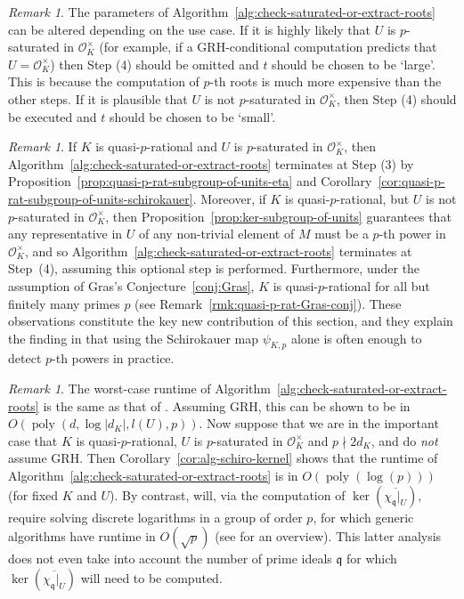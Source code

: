 \documentclass[12pt, a4paper, usenames]{amsart}
\theoremstyle{plain}
\theoremstyle{remark}
\newtheorem{remark}[theorem]{Remark}
\theoremstyle{definition}
\DeclareMathOperator{\poly}{poly}
\begin{document}
\begin{remark}\label{rmk:parameters}
The parameters of Algorithm~\ref{alg:check-saturated-or-extract-roots} can 
be altered depending on the use case. 
If it is highly likely that $U$ is $p$-saturated in $\mathcal{O}_{K}^{\times}$
(for example, if a GRH-conditional computation predicts that $U=\mathcal{O}_{K}^{\times}$)
then Step (4) should be omitted and $t$ should be chosen to be `large'.
This is because the computation of $p$-th roots is much more expensive
than the other steps. 
If it is plausible that $U$ is not $p$-saturated in $\mathcal{O}_{K}^{\times}$,
then Step (4) should be executed and $t$ should be chosen to be `small'.
\end{remark}

\begin{remark}\label{rem:satalg-complexity}
If $K$ is quasi-$p$-rational and 
$U$ is $p$-saturated in $\mathcal{O}_{K}^{\times}$, 
then Algorithm~\ref{alg:check-saturated-or-extract-roots} terminates at Step (3)
by Proposition~\ref{prop:quasi-p-rat-subgroup-of-units-eta} and Corollary~\ref{cor:quasi-p-rat-subgroup-of-units-schirokauer}.
Moreover, if $K$ is quasi-$p$-rational, but 
$U$ is not $p$-saturated in $\mathcal{O}_{K}^{\times}$, then Proposition~\ref{prop:ker-subgroup-of-units} guarantees that any representative in $U$ of any non-trivial element of $M$
must be a $p$-th power in $\mathcal{O}_{K}^{\times}$, and so 
Algorithm~\ref{alg:check-saturated-or-extract-roots} terminates at Step~(4), assuming
this optional step is performed.
Furthermore, under the assumption of Gras's Conjecture~\ref{conj:Gras}, $K$ is quasi-$p$-rational for all but finitely many primes $p$
(see Remark~\ref{rmk:quasi-p-rat-Gras-conj}). 
These observations constitute the key new contribution of this section, 
and they explain the finding in 
\cite[\S 6.2.3]{zbMATH07854947} that using the Schirokauer map $\psi_{K,p}$
alone is often enough to detect $p$-th powers in practice.
\end{remark}

\begin{remark}\label{rem:satalg-complexity-worst-case}
The worst-case runtime of Algorithm~\ref{alg:check-saturated-or-extract-roots} is the 
same as that of \cite[Algorithm~4.9]{MR4440537}.
Assuming GRH, this can be shown to be in $O(\poly(d, \log\lvert d_K\rvert, l(U), p))$.
Now suppose that we are in the important case that 
$K$ is quasi-$p$-rational, $U$ is $p$-saturated in $\mathcal{O}_{K}^{\times}$
and $p \nmid 2d_{K}$, and do \emph{not} assume GRH.
Then
Corollary~\ref{cor:alg-schiro-kernel} shows that
the runtime of Algorithm~\ref{alg:check-saturated-or-extract-roots}
is in $O(\poly(\log(p)))$ (for fixed $K$ and $U$).
By contrast, \cite[Algorithm~4.9]{MR4440537} will,
via the computation of $\ker(\overline{\chi_{\mathfrak{q}}\vert_{U}})$,
require solving discrete logarithms in a group of order $p$, for which generic algorithms have runtime in  $O(\sqrt{p})$ (see \cite{MR1745660} for an overview). This latter analysis
does not even take into account the number of prime ideals $\mathfrak{q}$ for which 
$\ker(\overline{\chi_{\mathfrak{q}}\vert_{U}})$ will need to be computed.
\end{remark}
\end{document}
